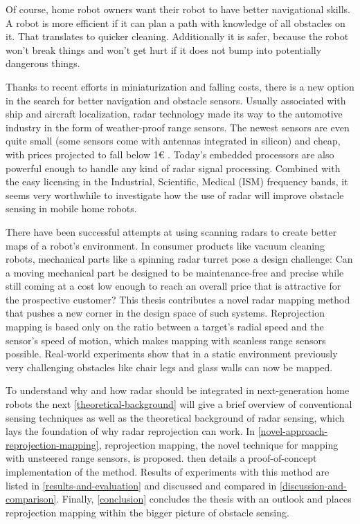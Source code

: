 Of course, home robot owners want their robot to have better
navigational skills. A robot is more efficient if it can plan a path
with knowledge of all obstacles on it. That translates to quicker
cleaning. Additionally it is safer, because the robot won't break
things and won't get hurt if it does not bump into potentially dangerous
things.

Thanks to recent efforts in miniaturization and falling costs, there is
a new option in the search for better navigation and obstacle sensors.
Usually associated with ship and aircraft localization, radar technology
made its way to the automotive industry in the form of weather-proof
range sensors. The newest sensors are even quite small (some sensors
come with antennas integrated in silicon) and cheap, with prices
projected to fall below 1€ \cite{Brouwer2015}. Today's embedded
processors are also powerful enough to handle any kind of radar signal
processing. Combined with the easy licensing in the Industrial,
Scientific, Medical (ISM) frequency bands, it seems very worthwhile to
investigate how the use of radar will improve obstacle sensing in mobile
home robots.

There have been successful attempts at using scanning radars to create better maps of a robot's environment. In consumer products like vacuum cleaning robots, mechanical parts like a spinning radar turret pose a design challenge: Can a moving mechanical part be designed to be maintenance-free and precise while still coming at a cost low enough to reach an overall price that is attractive for the prospective customer? This thesis contributes a novel radar mapping method that pushes a new corner in the design space of such systems. Reprojection mapping is based only on the ratio between a target's radial speed and the sensor's speed of motion, which makes mapping with scanless range sensors possible. Real-world experiments show that in a static environment previously very challenging obstacles like chair legs and glass walls can now be mapped.

To understand why and how radar should be integrated in next-generation home robots the next \cref{theoretical-background} will give a brief overview of conventional sensing techniques as well as the theoretical background of radar sensing, which lays the foundation of why radar reprojection can work. In \cref{novel-approach-reprojection-mapping}, reprojection mapping, the novel technique for mapping with unsteered range sensors, is proposed.  then details a proof-of-concept implementation of the method. Results of experiments with this method are listed in \cref{results-and-evaluation} and discussed and compared in \cref{discussion-and-comparison}. Finally, \cref{conclusion} concludes the thesis with an outlook and places reprojection mapping within the bigger picture of obstacle sensing.